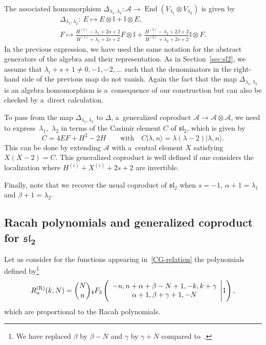 \documentclass[pdftex]{sigma}
\numberwithin{equation}{section}
\theoremstyle{definition}
\begin{document}
The associated homomorphism $\Delta_{\lambda_1,\lambda_2}\colon\mathcal{A} \to \operatorname{End}(V_{\lambda_1}\otimes V_{\lambda_2})$ is given by
\begin{gather*}
 \Delta_{\lambda_1,\lambda_2} \colon\ E\mapsto E\otimes \mathbb{I}+\mathbb{I}\otimes E,\\
 F\mapsto \frac{H^{(1)}-\lambda_1+2\alpha+2}{H^{(1)}+\lambda_1+2s+2}F\otimes \mathbb{I}+\frac{H^{(2)}-\lambda_2+2\beta+2}{H^{(2)}+\lambda_2+2s+2} \mathbb{I}\otimes F.
\end{gather*}
In the previous expression, we have used the same notation for the abstract generators of the algebra and their representation.
As in Section~\ref{sec:sl2}, we assume that $\lambda_i+s+1\neq0,-1,-2,\dots $ such that the denominators in the right-hand side of the previous map do not vanish. Again the fact that the map $\Delta_{\lambda_1,\lambda_2}$ is an algebra homomorphism is a~consequence of our construction but can also be checked by a~direct calculation.

To pass from the map $\Delta_{\lambda_1,\lambda_2}$ to $\Delta$, a~generalized coproduct $\mathcal{A}\to \mathcal{A}\otimes\mathcal{A}$, we need to express~$\lambda_1$,~$\lambda_2$ in terms of the Casimir element $C$ of $\mathfrak{sl}_2$, which is given by
\begin{equation}\label{eq:Cassl2}
 C=4EF+H^2-2H \qquad \text{with} \quad C|\lambda,n\rangle=\lambda(\lambda-2)|\lambda,n\rangle .
\end{equation}
This can be done by extending $\mathcal{A}$ with a~central element $X$ satisfying $X(X-2)=C$. This generalized coproduct is well defined if one considers the localization where $H^{(i)}+X^{(i)}+2s+2$ are invertible.

Finally, note that we recover the usual coproduct of $\mathfrak{sl}_2$ when $s=-1$, $\alpha+1=\lambda_1$ and $\beta+1=\lambda_2$.

\subsection[Racah polynomials and generalized coproduct for sl\_2]{Racah polynomials and generalized coproduct for $\boldsymbol{\mathfrak{sl}_2}$}\label{ssec:Racah}

Let us consider for the functions appearing in~\eqref{CG-relation} the polynomials defined by\footnote{We have replaced $\beta$ by $\beta-N$ and $\gamma$ by $\gamma+N$ compared to~\cite{contiguity}.}
\[R^{\rm (R)}_n(k,N)=\binom{N}{n}{}_4F_3\left(\begin{array}{c} -n, n+\alpha+\beta-N+1, -k, k+\gamma \\ \alpha+1, \beta+\gamma+1, -N\end{array}\Bigg\vert 1\right),\]
which are proportional to the Racah polynomials.
\end{document}
